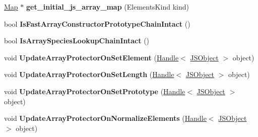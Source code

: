 \begin{DoxyCompactItemize}
\item 
\hyperlink{classv8_1_1internal_1_1_map}{Map} $\ast$ {\bfseries get\+\_\+initial\+\_\+js\+\_\+array\+\_\+map} (Elements\+Kind kind)\hypertarget{classv8_1_1internal_1_1_isolate_af9d6a949cc6b4229b2046b53e472f10b}{}\label{classv8_1_1internal_1_1_isolate_af9d6a949cc6b4229b2046b53e472f10b}

\item 
bool {\bfseries Is\+Fast\+Array\+Constructor\+Prototype\+Chain\+Intact} ()\hypertarget{classv8_1_1internal_1_1_isolate_aead07811eb80fcfa9d3ab7deb4cdf2b2}{}\label{classv8_1_1internal_1_1_isolate_aead07811eb80fcfa9d3ab7deb4cdf2b2}

\item 
bool {\bfseries Is\+Array\+Species\+Lookup\+Chain\+Intact} ()\hypertarget{classv8_1_1internal_1_1_isolate_acafa84933535e7f054cac75191b6431e}{}\label{classv8_1_1internal_1_1_isolate_acafa84933535e7f054cac75191b6431e}

\item 
void {\bfseries Update\+Array\+Protector\+On\+Set\+Element} (\hyperlink{classv8_1_1internal_1_1_handle}{Handle}$<$ \hyperlink{classv8_1_1internal_1_1_j_s_object}{J\+S\+Object} $>$ object)\hypertarget{classv8_1_1internal_1_1_isolate_a51363c2be32009aeed17faf4d0406b70}{}\label{classv8_1_1internal_1_1_isolate_a51363c2be32009aeed17faf4d0406b70}

\item 
void {\bfseries Update\+Array\+Protector\+On\+Set\+Length} (\hyperlink{classv8_1_1internal_1_1_handle}{Handle}$<$ \hyperlink{classv8_1_1internal_1_1_j_s_object}{J\+S\+Object} $>$ object)\hypertarget{classv8_1_1internal_1_1_isolate_a70a214c6d20d922ddf0d342e86cd1665}{}\label{classv8_1_1internal_1_1_isolate_a70a214c6d20d922ddf0d342e86cd1665}

\item 
void {\bfseries Update\+Array\+Protector\+On\+Set\+Prototype} (\hyperlink{classv8_1_1internal_1_1_handle}{Handle}$<$ \hyperlink{classv8_1_1internal_1_1_j_s_object}{J\+S\+Object} $>$ object)\hypertarget{classv8_1_1internal_1_1_isolate_a781a6588845f8651644b5bbf28441c8b}{}\label{classv8_1_1internal_1_1_isolate_a781a6588845f8651644b5bbf28441c8b}

\item 
void {\bfseries Update\+Array\+Protector\+On\+Normalize\+Elements} (\hyperlink{classv8_1_1internal_1_1_handle}{Handle}$<$ \hyperlink{classv8_1_1internal_1_1_j_s_object}{J\+S\+Object} $>$ object)\hypertarget{classv8_1_1internal_1_1_isolate_a46e7804373387652133032a65e4a9600}{}\label{classv8_1_1internal_1_1_isolate_a46e7804373387652133032a65e4a9600}


\end{DoxyCompactItemize}
